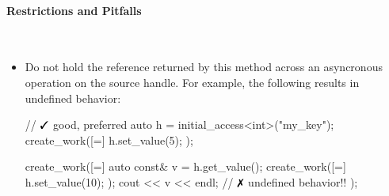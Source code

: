 \paragraph{Restrictions and Pitfalls}\mbox{}\\ 
\begin{itemize}
  \item Do not hold the reference returned by this method across an asyncronous
  operation on the source handle.  For example, the following results in
  undefined behavior:
  \begin{CppCode}
	// $\yes$ good, preferred
	auto h = initial_access<int>("my_key"); 
	create_work([=]{ h.set_value(5); });
	
	create_work([=]{ 
	  auto const& v = h.get_value();
	  create_work([=]{ h.set_value(10); });
	  cout << v << endl; // $\no$ undefined behavior!!
	});
  \end{CppCode}
\end{itemize}